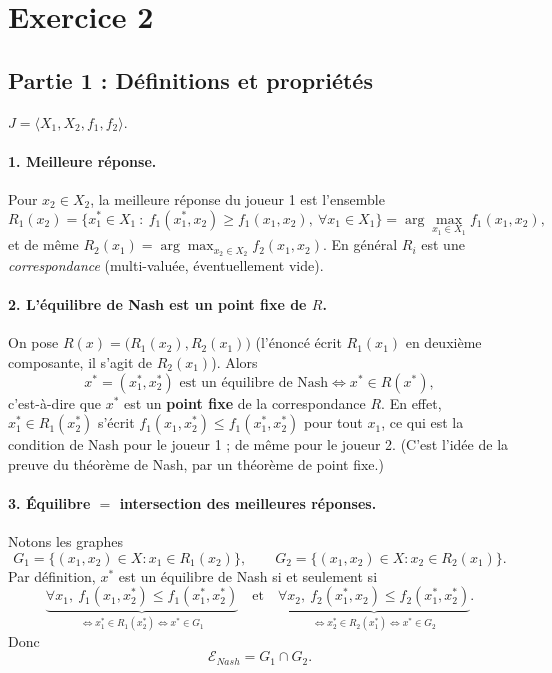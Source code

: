 \documentclass[11pt,a4paper]{article}
\begin{document}
\section*{Exercice 2}
\subsection*{Partie 1 : Définitions et propriétés}
$J=\langle X_1,X_2,f_1,f_2\rangle$.

\paragraph{1. Meilleure réponse.} Pour $x_2\in X_2$, la meilleure réponse du joueur 1 est l'ensemble
\[
R_1(x_2)=\Big\{x_1^*\in X_1\ :\ f_1(x_1^*,x_2)\ge f_1(x_1,x_2),\ \forall x_1\in X_1\Big\}=\arg\max_{x_1\in X_1}f_1(x_1,x_2),
\]
et de même $R_2(x_1)=\arg\max_{x_2\in X_2}f_2(x_1,x_2)$. En général $R_i$ est une \emph{correspondance} (multi-valuée, éventuellement vide).

\paragraph{2. L'équilibre de Nash est un point fixe de $R$.} On pose $R(x)=\big(R_1(x_2),R_2(x_1)\big)$ (l'énoncé écrit $R_1(x_1)$ en deuxième composante, il s'agit de $R_2(x_1)$). Alors
\[
x^*=(x_1^*,x_2^*)\text{ est un équilibre de Nash}\iff x^*\in R(x^*),
\]
c'est-à-dire que $x^*$ est un \textbf{point fixe} de la correspondance $R$. En effet, $x_1^*\in R_1(x_2^*)$ s'écrit $f_1(x_1,x_2^*)\le f_1(x_1^*,x_2^*)$ pour tout $x_1$, ce qui est la condition de Nash pour le joueur 1 ; de même pour le joueur 2. (C'est l'idée de la preuve du théorème de Nash, par un théorème de point fixe.)

\paragraph{3. Équilibre $=$ intersection des meilleures réponses.} Notons les graphes
\[
G_1=\{(x_1,x_2)\in X: x_1\in R_1(x_2)\},\qquad G_2=\{(x_1,x_2)\in X: x_2\in R_2(x_1)\}.
\]
Par définition, $x^*$ est un équilibre de Nash si et seulement si
\[
\underbrace{\forall x_1,\ f_1(x_1,x_2^*)\le f_1(x_1^*,x_2^*)}_{\iff x_1^*\in R_1(x_2^*)\iff x^*\in G_1}\quad\text{et}\quad\underbrace{\forall x_2,\ f_2(x_1^*,x_2)\le f_2(x_1^*,x_2^*)}_{\iff x_2^*\in R_2(x_1^*)\iff x^*\in G_2}.
\]
Donc
\[
\boxed{\mathcal{E}_{Nash}=G_1\cap G_2.}
\]
\end{document}
